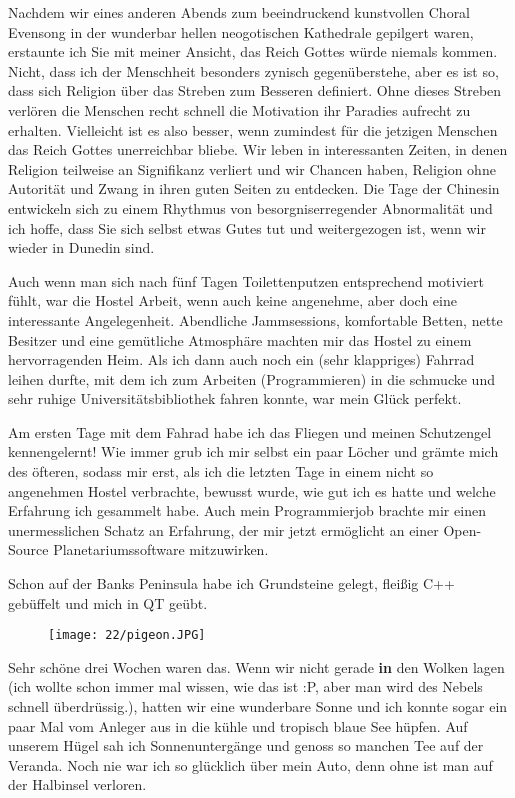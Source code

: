 Nachdem wir eines anderen Abends zum beeindruckend kunstvollen Choral
Evensong in der wunderbar hellen neogotischen Kathedrale gepilgert
waren, erstaunte ich Sie mit meiner Ansicht, das Reich Gottes würde
niemals kommen. Nicht, dass ich der Menschheit besonders zynisch
gegenüberstehe, aber es ist so, dass sich Religion über das Streben
zum Besseren definiert. Ohne dieses Streben verlören die Menschen
recht schnell die Motivation ihr Paradies aufrecht zu
erhalten. Vielleicht ist es also besser, wenn zumindest für die
jetzigen Menschen das Reich Gottes unerreichbar bliebe. Wir leben in
interessanten Zeiten, in denen Religion teilweise an Signifikanz
verliert und wir Chancen haben, Religion ohne Autorität und Zwang in
ihren guten Seiten zu entdecken. Die Tage der Chinesin entwickeln sich
zu einem Rhythmus von besorgniserregender Abnormalität und ich hoffe,
dass Sie sich selbst etwas Gutes tut und weitergezogen ist, wenn wir
wieder in Dunedin sind.

Auch wenn man sich nach fünf Tagen Toilettenputzen entsprechend
motiviert fühlt, war die Hostel Arbeit, wenn auch keine angenehme, aber
doch eine interessante Angelegenheit. Abendliche Jammsessions,
komfortable Betten, nette Besitzer und eine gemütliche Atmosphäre
machten mir das Hostel zu einem hervorragenden Heim. Als ich dann auch
noch ein (sehr klappriges) Fahrrad leihen durfte, mit dem ich zum
Arbeiten (Programmieren) in die schmucke und sehr ruhige
Universitätsbibliothek fahren konnte, war mein Glück perfekt.

Am ersten Tage mit dem Fahrad habe ich das Fliegen und meinen
Schutzengel kennengelernt! Wie immer grub ich mir selbst ein paar
Löcher und grämte mich des öfteren, sodass mir erst, als ich die
letzten Tage in einem nicht so angenehmen Hostel verbrachte, bewusst
wurde, wie gut ich es hatte und welche Erfahrung ich gesammelt
habe. Auch mein Programmierjob brachte mir einen unermesslichen Schatz
an Erfahrung, der mir jetzt ermöglicht an einer Open-Source
Planetariumssoftware mitzuwirken.

Schon auf der Banks Peninsula habe ich Grundsteine gelegt, fleißig C++
gebüffelt und mich in QT geübt.

\begin{figure}[h]
  \centering
  \texttt{[image: 22/pigeon.JPG]}
\end{figure}
Sehr schöne drei Wochen waren das. Wenn wir nicht gerade
\textbf{\textbf{in}} den Wolken lagen (ich wollte schon immer mal
wissen, wie das ist :P, aber man wird des Nebels schnell überdrüssig.),
hatten wir eine wunderbare Sonne und ich konnte sogar ein paar Mal vom
Anleger aus in die kühle und tropisch blaue See hüpfen. Auf unserem
Hügel sah ich Sonnenuntergänge und genoss so manchen Tee auf der
Veranda. Noch nie war ich so glücklich über mein Auto, denn ohne ist man
auf der Halbinsel verloren.

